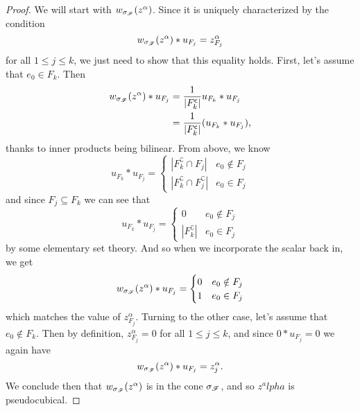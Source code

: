 \documentclass[12pt,oneside]{../../sfsuthesis}
\begin{document}
\begin{proof}
    We will start with \( w_{\sigma_{\mathscr{F}}}(z^\alpha) \).
    Since it is uniquely characterized by the condition
    \[
        w_{\sigma_{\mathscr{F}}}(z^\alpha) \ast u_{F_j} = z^\alpha_{F_j}
    \]
    for all \( 1 \leq j \leq k \), we just need to show that this equality holds.
    First, let's assume that \( e_0 \in F_k \).
    Then
    \begin{align*}
        w_{\sigma_{\mathscr{F}}}(z^\alpha) \ast u_{F_j} & = {\frac{1}{|F_k^{\mathsf{c}}|}}u_{F_k} \ast u_{F_j}    \\
                                                & = {\frac{1}{|F_k^{\mathsf{c}}|}}(u_{F_k} \ast u_{F_j}),
    \end{align*}
    thanks to inner products being bilinear.
    From above, we know
    \[
        u_{F_k} \ast u_{F_j} = \begin{cases}
            |F_k^\complement \cap F_j|             & e_0 \notin F_j \\
            |F_k^\complement \cap F_j^\complement| & e_0 \in F_j
        \end{cases}
    \]
    and since \( F_j \subseteq F_k \) we can see that
    \[
        u_{F_k} \ast u_{F_j} = \begin{cases}
            0                 & e_0 \notin F_j \\
            |F_k^\complement| & e_0 \in F_j
        \end{cases}
    \]
    by some elementary set theory.
    And so when we incorporate the scalar back in, we get
    \[
        w_{\sigma_{\mathscr{F}}}(z^\alpha) \ast u_{F_j} = \begin{cases}
            0 & e_0 \notin F_j \\
            1 & e_0 \in F_j
        \end{cases}
    \]
    which matches the value of \( z^\alpha_{F_j} \).
    Turning to the other case, let's assume that \( e_0 \notin F_k \).
    Then by definition, \( z^\alpha_{F_j} = 0 \) for all \( 1 \leq j \leq k \), and since \( 0 \ast u_{F_j} = 0 \) we again have
    \[
        w_{\sigma_{\mathscr{F}}}(z^\alpha) \ast u_{F_j} = z^\alpha_j.
    \]
    We conclude then that \( w_{\sigma_{\mathscr{F}}}(z^\alpha) \) is in the cone \( \sigma_{\mathscr{F}} \), and so \( z^alpha \) is pseudocubical.


\end{proof}
\end{document}
